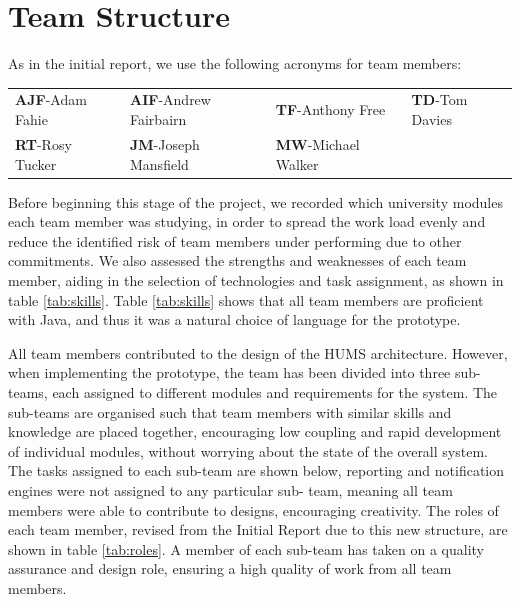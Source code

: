 \section{Team Structure}
\label{sec:team}

As in the initial report, we use the following acronyms for team members:

\begin{tabular}{ p{3cm} p{4cm} p{3.5cm} p{3.5cm} }
  \textbf{AJF}-Adam Fahie &
  \textbf{AIF}-Andrew Fairbairn &
  \textbf{TF}-Anthony Free &
  \textbf{TD}-Tom Davies \\
    \textbf{RT}-Rosy Tucker &
  \textbf{JM}-Joseph Mansfield &
  \textbf{MW}-Michael Walker \\
\end{tabular}

Before beginning this stage of the project, we recorded which university 
modules each team member was studying, in order to spread the work load evenly 
and reduce the identified risk of team members under performing due to 
other commitments. We also assessed the strengths and weaknesses of each 
team member, aiding in the selection of technologies and task assignment, as 
shown in table \ref{tab:skills}. Table \ref{tab:skills} shows that all team members 
are proficient with Java, and thus it was a natural choice of language for the 
prototype.

All team members contributed to the design of the HUMS architecture. 
However, when implementing the prototype, the team has been divided into three
sub-teams, each assigned to different modules and requirements for the system.
The sub-teams are organised such that team members with similar skills and 
knowledge are placed together, encouraging low coupling and rapid 
development of individual modules, without worrying about the state of the 
overall system. The tasks assigned to each sub-team are shown below, 
reporting and notification engines were not assigned to any particular sub-
team, meaning all team members were able to contribute to designs, 
encouraging creativity. The roles of each team member, revised from the Initial 
Report due to this new structure, are shown in table \ref{tab:roles}. A member of 
each sub-team has taken on a quality assurance and design role, ensuring a 
high quality of work from all team members.

